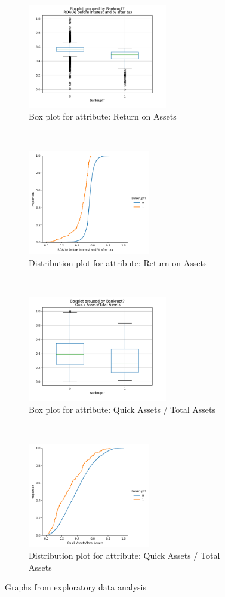 \documentclass{article}
\begin{document}
\begin{figure}[]
  \centering
  \begin{subfigure}[t]{0.5\textwidth}
      \centering
      \includegraphics[height=1.8in]{figures/ ROA(A) before interest and after tax-boxplot.png}
      \caption{Box plot for attribute: Return on Assets}
  \end{subfigure}%
  ~ 
  \begin{subfigure}[t]{0.5\textwidth}
      \centering
      \includegraphics[height=1.8in]{figures/ ROA(A) before interest and after tax-displot.png}
      \caption{Distribution plot for attribute: Return on Assets}
  \end{subfigure}
  ~ 
  \begin{subfigure}[b]{0.5\textwidth}
      \centering
      \includegraphics[height=1.8in]{figures/ Quick Assets_Total Assets-boxplot.png}
      \caption{Box plot for attribute: Quick Assets / Total Assets}
  \end{subfigure}%
  ~ 
  \begin{subfigure}[b]{0.5\textwidth}
      \centering
      \includegraphics[height=1.8in]{figures/ Quick Assets_Total Assets-displot.png}
      \caption{Distribution plot for attribute: Quick Assets / Total Assets}
  \end{subfigure}
  \caption{Graphs from exploratory data analysis}
  \label{fig:eda}
\end{figure}
\end{document}
